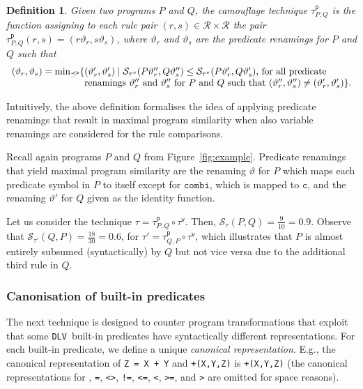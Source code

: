 \documentclass{tlp}
\newcommand{\dlv}{\texttt{DLV}\xspace}
\newcommand{\camouv}{\tau^\mathsf{v}}
\newcommand{\preceqp}{\preceq^\mathsf{p}}
\newcommand{\camoup}{\tau^\mathsf{p}}
\newcommand{\subst}{\vartheta}
\newcommand{\rules}{\mathcal{R}}
\newcommand{\progsim}[3]{\mathcal{S}_{#3}({#1},{#2})}
\newtheorem{definition}{Definition}
\begin{document}
\begin{definition}\label{def:predrenaming}
Given two programs $P$ and $Q$, the camouflage technique $\camoup_{P,Q}$ is the function assigning to
each rule pair $(r,s)\in \rules\times\rules$ the pair
$\camoup_{P,Q}(r,s) = (r\subst_{r}, s\subst_{s})$,
where $\subst_{r}$ and $\subst_{s}$ are the predicate renamings for $P$ and $Q$ such that
\[
\begin{array}{r@{}l}
(\subst_{r},\subst_{s})=\mathrm{min}_{\preceqp}\{&(\subst_{r}',\subst_{s}')\mid \progsim{P\subst_{r}''}{Q\subst_{s}''}{\tau^{v}} \leq \progsim{P\subst_{r}'}{Q\subst_{s}'}{\tau^{v}}\mbox{, for all predicate}\\
&\mbox{renamings $\subst_r''$ and $\subst_s''$ for $P$ and $Q$ such that }(\subst_{r}'', \subst_{s}'')  \neq (\subst_{r}', \subst_{s}')\}.
\end{array}
\]
\end{definition}


Intuitively, the above definition formalises the idea of applying predicate renamings that result in maximal
program similarity when also variable renamings are considered for the rule comparisons. 

Recall again programs $P$ and $Q$ from Figure~\ref{fig:example}. 
Predicate renamings that yield maximal program similarity are
the renaming $\subst$ for $P$ which maps each predicate symbol in $P$ to itself except
for $\mathtt{combi}$, which is mapped to $ \mathtt{c}$, and the renaming $\subst'$ for $Q$ given as the identity function. 
 
Let us consider the technique $\tau =  \camoup_{P,Q} \circ \camouv$.
Then,
$\progsim{P}{Q}{\tau} = \frac{9}{10}=0.9$.
Observe
that $\progsim{Q}{P}{\tau'} = \frac{18}{30}=0.6$, for $\tau' =  \camoup_{Q,P} \circ \camouv$, which
illustrates that
$P$ is almost entirely subsumed (syntactically) by $Q$ but not vice versa due to the additional third rule in $Q$.

\subsubsection{Canonisation of built-in predicates}

The next technique is designed to counter program transformations that exploit that
some \dlv\ built-in predicates have  syntactically  different 
representations.
For each built-in predicate, we define a unique \emph{canonical  representation}.
E.g., the canonical representation of {\tt Z = X + Y} and {\tt +(X,Y,Z)} is {\tt +(X,Y,Z)} (the canonical representations for {\tt  *}, {\tt  =}, {\tt  <>}, {\tt  !=}, {\tt  <=}, {\tt  <}, {\tt  >=}, and {\tt  >} are omitted for space reasons).
\end{document}
